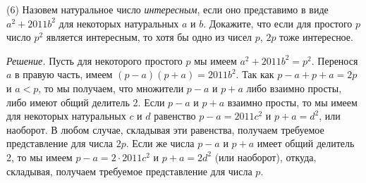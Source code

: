 \textsf{(6)}
Назовем натуральное число \emph{интересным}, если оно представимо в виде
$a^2 + 2011 b^2$ для некоторых натуральных $a$ и $b$.
Докажите, что если для простого $p$ число $p^2$ является интересным, то хотя бы
одно из чисел $p$, $2 p$ тоже интересное.

\solution
\emph{Решение.}
Пусть для некоторого простого $p$ мы имеем $a^2 + 2011 b^2 = p^2$.
Перенося $a$ в правую часть, имеем $(p - a) (p + a) = 2011 b^2$.
Так как $p - a + p + a = 2 p$ и $a < p$, то мы получаем, что множители $p - a$
и $p + a$ либо взаимно просты, либо имеют общий делитель 2.
Если $p - a$ и $p + a$ взаимно просты, то мы имеем для некоторых натуральных
$c$ и $d$ равенство $p - a = 2011 c^2$ и $p + a = d^2$, или наоборот.
В любом случае, складывая эти равенства, получаем требуемое представление для
числа $2 p$.
Если же числа $p - a$ и $p + a$ имеет общий делитель 2, то мы имеем
$p - a = 2 \cdot 2011 c^2$ и $p + a = 2 d^2$ (или наоборот), откуда, складывая,
получаем требуемое представление для числа $p$.

